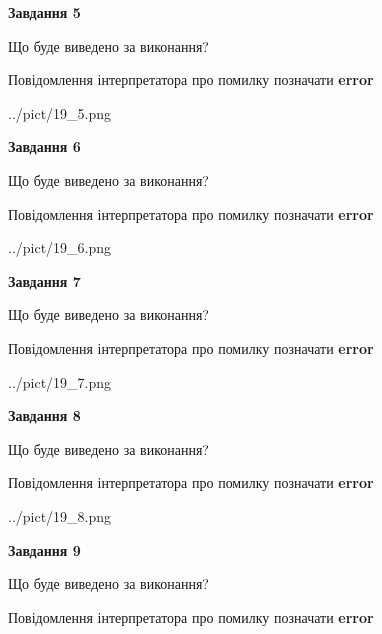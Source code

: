 \documentclass[11pt, ukrainian]{article}
\begin{document}
{\begin {large}
{\begin {center}\textbf{Завдання 5}\end {center}}\par
Що буде виведено за виконання? \par
Повідомлення інтерпретатора про помилку позначати \textbf{error}

\begin{center}
	{../pict/19_5.png}
\end{center}
\newpage

{\begin {center}\textbf{Завдання 6}\end {center}}\par
Що буде виведено за виконання? \par
Повідомлення інтерпретатора про помилку позначати \textbf{error}

\begin{center}
	{../pict/19_6.png}
\end{center}
\newpage

{\begin {center}\textbf{Завдання 7}\end {center}}\par
Що буде виведено за виконання? \par
Повідомлення інтерпретатора про помилку позначати \textbf{error}

\begin{center}
	{../pict/19_7.png}
\end{center}
\newpage

{\begin {center}\textbf{Завдання 8}\end {center}}\par
Що буде виведено за виконання? \par
Повідомлення інтерпретатора про помилку позначати \textbf{error}

\begin{center}
	{../pict/19_8.png}
\end{center}
\newpage

{\begin {center}\textbf{Завдання 9}\end {center}}\par
Що буде виведено за виконання? \par
Повідомлення інтерпретатора про помилку позначати \textbf{error}


\end{large}}
\end{document}
